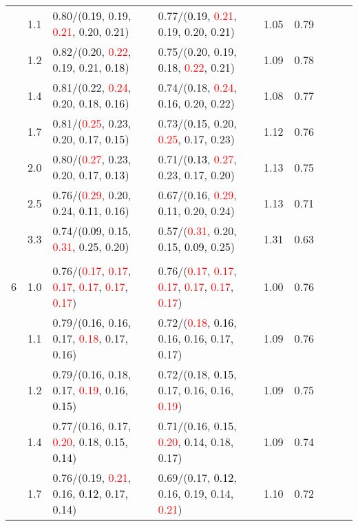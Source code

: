 \documentclass[10pt,a4paper]{report}
\begin{document}
\begin{table}[!htbp]
\begin{center}
{\begin{tabular}{ccllccccc}
			&1.1&0.80/(\textcolor{black}{0.19}, 0.19, \textcolor{red}{0.21}, 0.20, 0.21)&0.77/(\textcolor{black}{0.19}, \textcolor{red}{0.21}, 0.19, 0.20, 0.21)&1.05&0.79\\
			&1.2&0.82/(0.20, \textcolor{red}{0.22}, 0.19, 0.21, \textcolor{black}{0.18})&0.75/(0.20, 0.19, \textcolor{black}{0.18}, \textcolor{red}{0.22}, 0.21)&1.09&0.78\\
			&1.4&0.81/(0.22, \textcolor{red}{0.24}, 0.20, 0.18, \textcolor{black}{0.16})&0.74/(0.18, \textcolor{red}{0.24}, \textcolor{black}{0.16}, 0.20, 0.22)&1.08&0.77\\
			&1.7&0.81/(\textcolor{red}{0.25}, 0.23, 0.20, 0.17, \textcolor{black}{0.15})&0.73/(\textcolor{black}{0.15}, 0.20, \textcolor{red}{0.25}, 0.17, 0.23)&1.12&0.76\\
			&2.0&0.80/(\textcolor{red}{0.27}, 0.23, 0.20, 0.17, \textcolor{black}{0.13})&0.71/(\textcolor{black}{0.13}, \textcolor{red}{0.27}, 0.23, 0.17, 0.20)&1.13&0.75\\
			&2.5&0.76/(\textcolor{red}{0.29}, 0.20, 0.24, \textcolor{black}{0.11}, 0.16)&0.67/(0.16, \textcolor{red}{0.29}, \textcolor{black}{0.11}, 0.20, 0.24)&1.13&0.71\\
			&3.3&0.74/(\textcolor{black}{0.09}, 0.15, \textcolor{red}{0.31}, 0.25, 0.20)&0.57/(\textcolor{red}{0.31}, 0.20, 0.15, \textcolor{black}{0.09}, 0.25)&1.31&0.63\\
			&&&&\\
			6			&1.0&0.76/(\textcolor{red}{0.17}, \textcolor{red}{0.17}, \textcolor{red}{0.17}, \textcolor{red}{0.17}, \textcolor{red}{0.17}, \textcolor{red}{0.17})&0.76/(\textcolor{red}{0.17}, \textcolor{red}{0.17}, \textcolor{red}{0.17}, \textcolor{red}{0.17}, \textcolor{red}{0.17}, \textcolor{red}{0.17})&1.00&0.76\\
			&1.1&0.79/(\textcolor{black}{0.16}, 0.16, 0.17, \textcolor{red}{0.18}, 0.17, 0.16)&0.72/(\textcolor{red}{0.18}, \textcolor{black}{0.16}, 0.16, 0.16, 0.17, 0.17)&1.09&0.76\\
			&1.2&0.79/(0.16, 0.18, 0.17, \textcolor{red}{0.19}, 0.16, \textcolor{black}{0.15})&0.72/(0.18, \textcolor{black}{0.15}, 0.17, 0.16, 0.16, \textcolor{red}{0.19})&1.09&0.75\\
			&1.4&0.77/(0.16, 0.17, \textcolor{red}{0.20}, 0.18, 0.15, \textcolor{black}{0.14})&0.71/(0.16, 0.15, \textcolor{red}{0.20}, \textcolor{black}{0.14}, 0.18, 0.17)&1.09&0.74\\
			&1.7&0.76/(0.19, \textcolor{red}{0.21}, 0.16, \textcolor{black}{0.12}, 0.17, 0.14)&0.69/(0.17, \textcolor{black}{0.12}, 0.16, 0.19, 0.14, \textcolor{red}{0.21})&1.10&0.72\\

\end{tabular}}
\end{center}
\end{table}
\end{document}
